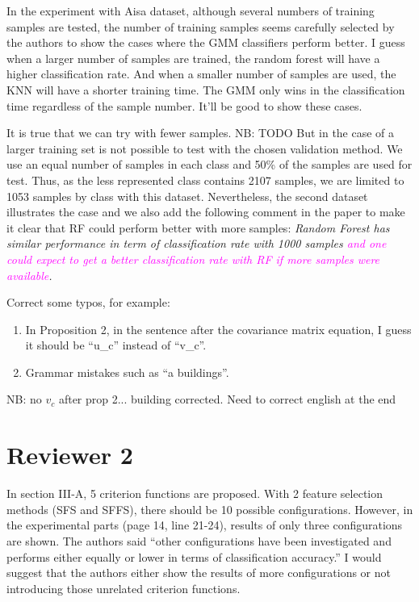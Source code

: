 \documentclass[a4paper,10pt,DIV=16]{scrartcl}
\newcommand{\rev}[1]{\textcolor{magenta}{#1}}
\begin{document}
\begin{revbox}
  In the experiment with Aisa dataset, although several numbers of training samples are tested, the number of training samples seems carefully selected by the authors to show the cases where the GMM classifiers perform better. I guess when a larger number of samples are trained, the random forest will have a higher classification rate. And when a smaller number of samples are used, the KNN will have a shorter training time. The GMM only wins in the classification time regardless of the sample number. It’ll be good to show these cases.
  \begin{resbox}
    It is true that we can try with fewer samples. NB: TODO
    But in the case of a larger training set is not possible to test with the chosen validation method. We use an equal number of samples in each class and 50\% of the samples are used for test. Thus, as the less represented class contains 2107 samples, we are limited to 1053 samples by class with this dataset. Nevertheless, the second dataset illustrates the case and we also add the following comment in the paper to make it clear that RF could perform better with more samples:
    \emph{Random Forest has similar performance in term of classification rate with 1000 samples \rev{ and one could expect to get a better classification rate with RF if more samples were available}.}
  \end{resbox}
\end{revbox}

\begin{revbox}
  Correct some typos, for example:
  \begin{enumerate}
    \item In Proposition 2, in the sentence after the covariance matrix equation, I guess it should be ``u\_c'' instead of ``v\_c''.
    \item Grammar mistakes such as ``a buildings''.
  \end{enumerate}
  \begin{resbox}
    NB:
    no $v_c$ after prop 2...
    building corrected. Need to correct english at the end
  \end{resbox}
\end{revbox}

\section{Reviewer 2}
\begin{revbox}
  In section III-A, 5 criterion functions are proposed. With 2 feature selection methods (SFS and SFFS), there should be 10 possible configurations. However, in the experimental parts (page 14, line 21-24), results of only three configurations are shown. The authors said “other configurations have been investigated and performs either equally or lower in terms of classification accuracy.” I would suggest that the authors either show the results of more configurations or not introducing those unrelated criterion functions.
  \begin{resbox}

  \end{resbox}
\end{revbox}
\end{document}

